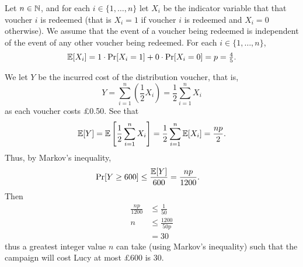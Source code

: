 \subpart\hspace{0em}
\begin{solution}
    Let $n \in \mathbb N$, and for each $i \in \{1, \ldots, n\}$ let $X_i$ be the indicator variable that that voucher $i$ is redeemed (that is $X_i = 1$ if voucher $i$ is redeemed and $X_i = 0$ otherwise). We assume that the event of a voucher being redeemed is independent of the event of any other voucher being redeemed. For each $i \in \{1, \ldots, n\}$,
    \[ \mathbb E[X_i] = 1\cdot \Pr[X_i = 1] + 0 \cdot \Pr[X_i = 0] = p = \tfrac45. \]
    
    We let $Y$ be the incurred cost of the distribution voucher, that is,
    \[ Y = \sum_{i=1}^n \left(\frac12X_i\right) = \frac12 \sum_{i=1}^n X_i  \]
    as each voucher costs £\num{0.50}.
    See that
    \[ \mathbb E[Y] = \mathbb E\left[\frac12 \sum_{i=1}^n X_i \right] = \frac12\sum_{i=1}^n \mathbb E[X_i] = \frac{np}{2}. \]
    Thus, by Markov's inequality,
    \begin{align*}
        \Pr[Y \geq 600] &\leq \frac{\mathbb E[Y]}{600} = \frac{np}{1200}.
    \end{align*}
    Then
    \begin{align*}
        \frac{np}{1200} &\leq \frac{1}{50} \\
        n &\leq \frac{1200}{50p} \\
        &= 30
    \end{align*}
    thus a greatest integer value $n$ can take (using Markov's inequality) such that the campaign will cost Lucy at most £\num{600} is $30$. 
\end{solution}